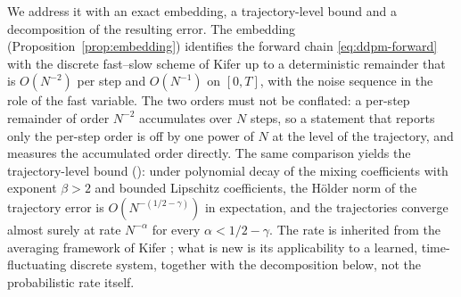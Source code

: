 \documentclass[a4paper,fleqn]{cas-dc}
\theoremstyle{definition}
\begin{document}
We address it with an exact embedding, a trajectory-level bound and a decomposition of
the resulting error. The embedding (Proposition~\ref{prop:embedding}) identifies the
forward chain \eqref{eq:ddpm-forward} with the discrete fast--slow scheme of Kifer
\cite{kifer2025} up to a deterministic remainder that is $O(N^{-2})$ per step and
$O(N^{-1})$ on $[0,T]$, with the noise sequence in the role of the fast variable. The
two orders must not be conflated: a per-step remainder of order $N^{-2}$ accumulates
over $N$ steps, so a statement that reports only the per-step order is off by one power
of $N$ at the level of the trajectory, and  measures the accumulated
order directly. The same comparison yields the trajectory-level bound
(): under polynomial decay of the mixing coefficients with exponent
$\beta>2$ and bounded Lipschitz coefficients, the H\"older norm of the trajectory error
is $O(N^{-(1/2-\gamma)})$ in expectation, and the trajectories converge almost surely
at rate $N^{-\alpha}$ for every $\alpha<1/2-\gamma$. The rate is inherited from the
averaging framework of Kifer \cite{kifer2025}; what is new is its applicability to a
learned, time-fluctuating discrete system, together with the decomposition below, not
the probabilistic rate itself.
\end{document}
